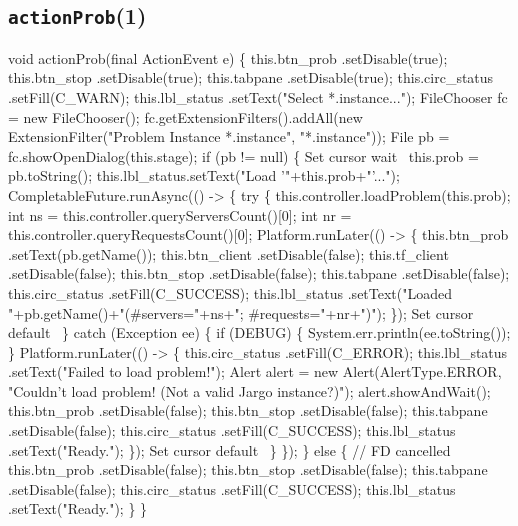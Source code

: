 \subsection{\texttt{actionProb}(1)}
\nwenddocs{}\endmoddef{}
void actionProb(final ActionEvent e) \{
  this.btn_prob     .setDisable(true);
  this.btn_stop     .setDisable(true);
  this.tabpane      .setDisable(true);
  this.circ_status  .setFill(C_WARN);
  this.lbl_status   .setText("Select *.instance...");
  FileChooser fc = new FileChooser();
  fc.getExtensionFilters().addAll(new ExtensionFilter("Problem Instance *.instance", "*.instance"));
  File pb = fc.showOpenDialog(this.stage);
  if (pb != null) \{
    \LA{}Set cursor wait~{\nwtagstyle{}}\RA{}
    this.prob = pb.toString();
    this.lbl_status.setText("Load '"+this.prob+"'...");
    CompletableFuture.runAsync(() -> \{
      try \{
        this.controller.loadProblem(this.prob);
        int ns = this.controller.queryServersCount()[0];
        int nr = this.controller.queryRequestsCount()[0];
        Platform.runLater(() -> \{
          this.btn_prob     .setText(pb.getName());
          this.btn_client   .setDisable(false);
          this.tf_client    .setDisable(false);
          this.btn_stop     .setDisable(false);
          this.tabpane      .setDisable(false);
          this.circ_status  .setFill(C_SUCCESS);
          this.lbl_status   .setText("Loaded "+pb.getName()+"(#servers="+ns+"; #requests="+nr+")");
        \});
        \LA{}Set cursor default~{\nwtagstyle{}}\RA{}
      \} catch (Exception ee) \{
        if (DEBUG) \{
          System.err.println(ee.toString());
        \}
        Platform.runLater(() -> \{
          this.circ_status  .setFill(C_ERROR);
          this.lbl_status   .setText("Failed to load problem!");
          Alert alert = new Alert(AlertType.ERROR, "Couldn't load problem! (Not a valid Jargo instance?)");
          alert.showAndWait();
          this.btn_prob     .setDisable(false);
          this.btn_stop     .setDisable(false);
          this.tabpane      .setDisable(false);
          this.circ_status  .setFill(C_SUCCESS);
          this.lbl_status   .setText("Ready.");
        \});
        \LA{}Set cursor default~{\nwtagstyle{}}\RA{}
      \}
    \});
  \} else \{
    // FD cancelled
    this.btn_prob     .setDisable(false);
    this.btn_stop     .setDisable(false);
    this.tabpane      .setDisable(false);
    this.circ_status  .setFill(C_SUCCESS);
    this.lbl_status   .setText("Ready.");
  \}
\}
\nwendcode{}\nwdocspar

